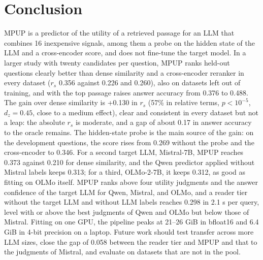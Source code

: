 \documentclass[conference]{IEEEtran}
\begin{document}
\section{Conclusion}
MPUP is a predictor of the utility of a retrieved passage for an LLM that combines 16 inexpensive signals, among them a probe on the hidden state of the LLM and a cross-encoder score, and does not fine-tune the target model. In a larger study with twenty candidates per question, MPUP ranks held-out questions clearly better than dense similarity and a cross-encoder reranker in every dataset ($r_s$ 0.356 against 0.226 and 0.260), also on datasets left out of training, and with the top passage raises answer accuracy from 0.376 to 0.488. The gain over dense similarity is +0.130 in $r_s$ (57\% in relative terms, $p < 10^{-5}$, $d_z = 0.45$, close to a medium effect), clear and consistent in every dataset but not a leap: the absolute $r_s$ is moderate, and a gap of about 0.17 in answer accuracy to the oracle remains. The hidden-state probe is the main source of the gain: on the development questions, the score rises from 0.269 without the probe and the cross-encoder to 0.346. For a second target LLM, Mistral-7B, MPUP reaches 0.373 against 0.210 for dense similarity, and the Qwen predictor applied without Mistral labels keeps 0.313; for a third, OLMo-2-7B, it keeps 0.312, as good as fitting on OLMo itself. MPUP ranks above four utility judgments and the answer confidence of the target LLM for Qwen, Mistral, and OLMo, and a reader tier without the target LLM and without LLM labels reaches 0.298 in 2.1 s per query, level with or above the best judgments of Qwen and OLMo but below those of Mistral. Fitting on one GPU, the pipeline peaks at 21--26 GiB in bfloat16 and 6.4 GiB in 4-bit precision on a laptop. Future work should test transfer across more LLM sizes, close the gap of 0.058 between the reader tier and MPUP and that to the judgments of Mistral, and evaluate on datasets that are not in the pool.




\end{document}
